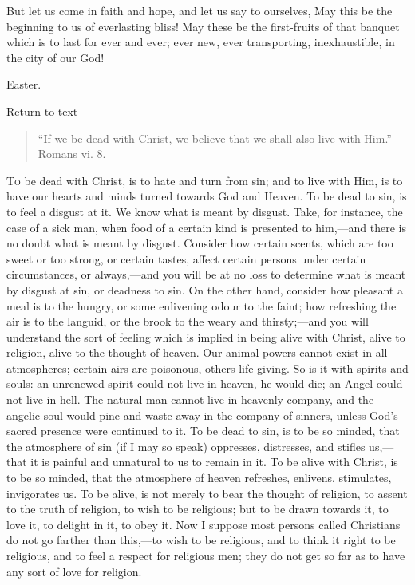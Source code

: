 But let us come in faith and hope, and let us say to ourselves, May
this be the beginning to us of everlasting bliss! May these be the
first-fruits of that banquet which is to last for ever and ever; ever
new, ever transporting, inexhaustible, in the city of our God!


Easter.

Return to text


\begin{quote}

``If we be dead with Christ, we believe that we shall also
live with Him.'' Romans vi. 8.

\end{quote}

T\textsc{o} be dead with Christ, is to hate and turn from sin; and to live
with Him, is to have our hearts and minds turned towards God and
Heaven. To be dead to sin, is to feel a disgust at it. We know what is
meant by disgust. Take, for instance, the case of a sick man, when
food of a certain kind is presented to him,—and there is no doubt
what is meant by disgust. Consider how certain scents, which are too
sweet or too strong, or certain tastes, affect certain persons under
certain circumstances, or always,—and you will be at no loss to
determine what is meant by disgust at sin, or deadness to sin. On the
other hand, consider how pleasant a meal is to the hungry, or some
enlivening odour to the faint; how refreshing the air is to the
languid, or the brook to the weary and thirsty;—and you will
understand the sort of feeling which is implied in being alive with
Christ, alive to religion, alive to the thought of heaven. Our animal
powers cannot exist in all atmospheres; certain airs are poisonous,
others life-giving. So is it with spirits and souls: an unrenewed
spirit could not live in heaven, he would die; an Angel could not live
in hell. The natural man cannot live in heavenly company, and the
angelic soul would pine and waste away in the company of sinners,
unless God's sacred presence were continued to it. To be dead to sin,
is to be so minded, that the atmosphere of sin (if I may so speak)
oppresses, distresses, and stifles us,—that it is painful and
unnatural to us to remain in it. To be alive with Christ, is to be so
minded, that the atmosphere of heaven refreshes, enlivens, stimulates,
invigorates us. To be alive, is not merely to bear the thought of
religion, to assent to the truth of religion, to wish to be religious;
but to be drawn towards it, to love it, to delight in it, to obey it.
Now I suppose most persons called Christians do not go farther than
this,—to wish to be religious, and to think it right to be
religious, and to feel a respect for religious men; they do not get so
far as to have any sort of love for religion.


